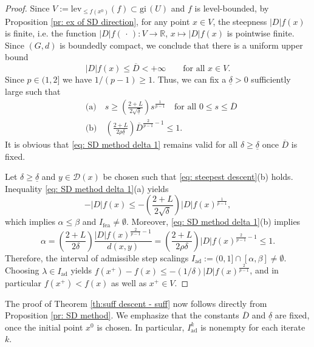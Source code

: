 \documentclass{article}
\theoremstyle{plain}\newtheorem{theorem}{Theorem}[section]
\theoremstyle{plain}\newtheorem{definition}[theorem]{Definition}
\theoremstyle{plain}\newtheorem{lemma}[theorem]{Lemma}
\theoremstyle{definition}\newtheorem{remark}[theorem]{Remark}
\theoremstyle{definition}\newtheorem{example}[theorem]{Example}
\theoremstyle{plain}\newtheorem{proposition}[theorem]{Proposition}
\theoremstyle{plain}\newtheorem{inference}[theorem]{Inference}
\theoremstyle{plain}\newtheorem{corollary}[theorem]{Corollary}
\theoremstyle{plain}\newtheorem{assumption}[theorem]{Assumption}
\begin{document}
\begin{proof}
    Since $V:=\mathrm{lev}_{\leq f(x^0)}(f)\subset \mathrm{gi}\,(U)$ and $f$ is level-bounded, by Proposition \ref{pr: ex of SD direction}, for any point $x\in V$, the steepness $|D|f(x)$ is finite, i.e. the function $|D|f(\,\cdot\,):V\to\mathbb{R}$, $x\mapsto|D|f(x)$ is pointwise finite. Since $(G,d)$ is boundedly compact, we conclude that there is a uniform upper bound
    $$
    |D|f(x)\leq\overline{D}<+\infty \qquad\text{for all}\,\,x\in V.
    $$
    Since $p\in(1,2]$ we have $1/(p-1)\geq 1$. Thus, we can fix a $\underline{\delta}>0$ sufficiently large such that
    \begin{equation}\label{eq: SD method delta 1}
        \begin{aligned}
            &\mbox{(a)}\quad  s\geq\left(\frac{2+L}{2\sqrt{\underline{\delta}}}\right)s^{\frac{1}{p-1}} \quad\text{for all}\,\,0\leq s\leq\overline{D}\\
            &\mbox{(b)}\quad \left(\frac{2+L}{2\rho\underline{\delta}}\right)\overline{D}^{\frac{2}{p-1}-1}\leq 1.
        \end{aligned}
    \end{equation}
    It is obvious that \eqref{eq: SD method delta 1} remains valid for all $\delta\geq\underline{\delta}$ once $\overline{D}$ is fixed.

    Let $\delta\geq\underline{\delta}$ and $y\in\mathcal{D}(x)$ be chosen such that \eqref{eq: steepest descent}(b) holds. Inequality \eqref{eq: SD method delta 1}(a) yields
    $$
    -|D|f(x)\leq-\left(\frac{2+L}{2\sqrt{\delta}}\right)|D|f(x)^{\frac{1}{p-1}},
    $$
    which implies $\alpha\leq\beta$ and $I_{\mathrm{fea}}\neq\emptyset$. Moreover, \eqref{eq: SD method delta 1}(b) implies
    $$
    \alpha=\left(\frac{2+L}{2\delta}\right)\frac{|D|f(x)^{\frac{2}{p-1}-1}}{d(x,y)}=\left(\frac{2+L}{2\rho\delta}\right)|D|f(x)^{\frac{2}{p-1}-1}\leq 1.
    $$
    Therefore, the interval of admissible step scalings $I_{\mathrm{ad}}:=(0,1]\cap[\alpha,\beta]\neq\emptyset$. Choosing $\lambda\in I_{\mathrm{ad}}$ yields $f(x^+)-f(x)\leq-(1/\delta)|D|f(x)^{\frac{2}{p-1}}$, and in particular $f(x^+)<f(x)$ as well as $x^+\in V$.
\end{proof}
The proof of Theorem \ref{th:suff descent - suff} now follows directly from  Proposition \ref{pr: SD method}. We emphasize that the constants $\overline{D}$ and $\underline{\delta}$ are fixed, once the initial point $x^0$ is chosen. In particular, $I_{\mathrm{ad}}^k$ is nonempty for each iterate $k$.
\end{document}
